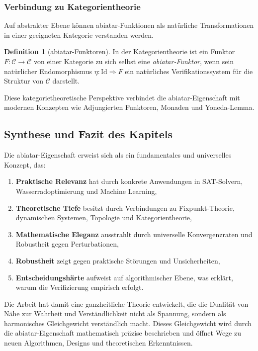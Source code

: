 \documentclass[a4paper,12pt]{article}
\theoremstyle{definition}
\newtheorem{definition}{Definition}
\begin{document}
\subsubsection{Verbindung zu Kategorientheorie}

Auf abstrakter Ebene können abiatar-Funktionen als natürliche Transformationen in einer geeigneten Kategorie verstanden werden.

\begin{definition}[abiatar-Funktoren]
In der Kategorientheorie ist ein Funktor $F: \mathcal{C} \to \mathcal{C}$ von einer Kategorie zu sich selbst eine \textit{abiatar-Funktor}, wenn sein natürlicher Endomorphismus $\eta: \text{Id} \Rightarrow F$ ein natürliches Verifikationssystem für die Struktur von $\mathcal{C}$ darstellt.
\end{definition}

Diese kategorietheoretische Perspektive verbindet die abiatar-Eigenschaft mit modernen Konzepten wie Adjungierten Funktoren, Monaden und Yoneda-Lemma.

\subsection{Synthese und Fazit des Kapitels}

Die abiatar-Eigenschaft erweist sich als ein fundamentales und universelles Konzept, das:

\begin{enumerate}
\item \textbf{Praktische Relevanz} hat durch konkrete Anwendungen in SAT-Solvern, Wasserradoptimierung und Machine Learning,

\item \textbf{Theoretische Tiefe} besitzt durch Verbindungen zu Fixpunkt-Theorie, dynamischen Systemen, Topologie und Kategorientheorie,

\item \textbf{Mathematische Eleganz} ausstrahlt durch universelle Konvergenzraten und Robustheit gegen Perturbationen,

\item \textbf{Robustheit} zeigt gegen praktische Störungen und Unsicherheiten,

\item \textbf{Entscheidungshärte} aufweist auf algorithmischer Ebene, was erklärt, warum die Verifizierung empirisch erfolgt.
\end{enumerate}

Die Arbeit hat damit eine ganzheitliche Theorie entwickelt, die die Dualität von Nähe zur Wahrheit und Verständlichkeit nicht als Spannung, sondern als harmonisches Gleichgewicht verständlich macht. Dieses Gleichgewicht wird durch die abiatar-Eigenschaft mathematisch präzise beschrieben und öffnet Wege zu neuen Algorithmen, Designs und theoretischen Erkenntnissen.
\end{document}
